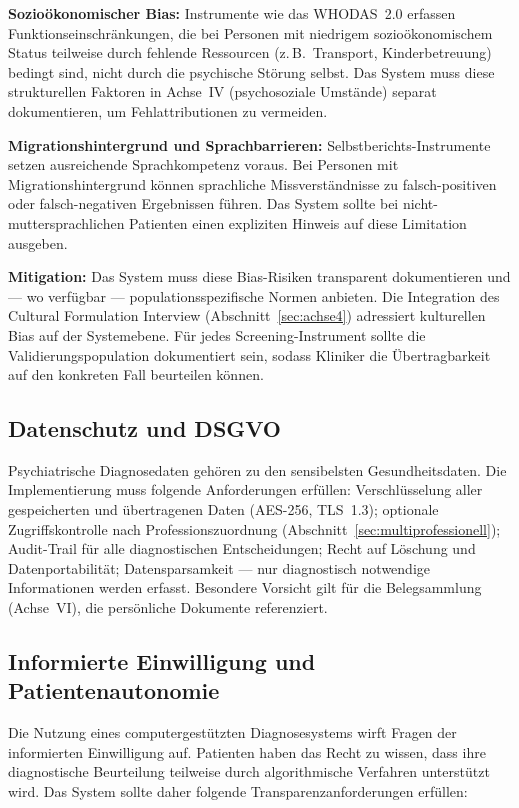 \documentclass[11pt,a4paper]{article}
\begin{document}
\textbf{Sozio\"okonomischer Bias:} Instrumente wie das WHODAS~2.0 erfassen Funktionseinschr\"ankungen, die bei Personen mit niedrigem sozio\"okonomischem Status teilweise durch fehlende Ressourcen (z.\,B.\ Transport, Kinderbetreuung) bedingt sind, nicht durch die psychische St\"orung selbst. Das System muss diese strukturellen Faktoren in Achse~IV (psychosoziale Umst\"ande) separat dokumentieren, um Fehlattributionen zu vermeiden.

\textbf{Migrationshintergrund und Sprachbarrieren:} Selbstberichts-Instrumente setzen ausreichende Sprachkompetenz voraus. Bei Personen mit Migrationshintergrund k\"onnen sprachliche Missverst\"andnisse zu falsch-positiven oder falsch-negativen Ergebnissen f\"uhren. Das System sollte bei nicht-muttersprachlichen Patienten einen expliziten Hinweis auf diese Limitation ausgeben.

\textbf{Mitigation:} Das System muss diese Bias-Risiken transparent dokumentieren und --- wo verf\"ugbar --- populationsspezifische Normen anbieten. Die Integration des Cultural Formulation Interview (Abschnitt~\ref{sec:achse4}) adressiert kulturellen Bias auf der Systemebene. F\"ur jedes Screening-Instrument sollte die Validierungspopulation dokumentiert sein, sodass Kliniker die \"Ubertragbarkeit auf den konkreten Fall beurteilen k\"onnen.

\subsection{Datenschutz und DSGVO}

Psychiatrische Diagnosedaten geh\"oren zu den sensibelsten Gesundheitsdaten. Die Implementierung muss folgende Anforderungen erf\"ullen: Verschl\"usselung aller gespeicherten und \"ubertragenen Daten (AES-256, TLS~1.3); optionale Zugriffskontrolle nach Professionszuordnung (Abschnitt~\ref{sec:multiprofessionell}); Audit-Trail f\"ur alle diagnostischen Entscheidungen; Recht auf L\"oschung und Datenportabilit\"at; Datensparsamkeit --- nur diagnostisch notwendige Informationen werden erfasst. Besondere Vorsicht gilt f\"ur die Belegsammlung (Achse~VI), die pers\"onliche Dokumente referenziert.

\subsection{Informierte Einwilligung und Patientenautonomie}

Die Nutzung eines computergest\"utzten Diagnosesystems wirft Fragen der informierten Einwilligung auf. Patienten haben das Recht zu wissen, dass ihre diagnostische Beurteilung teilweise durch algorithmische Verfahren unterst\"utzt wird. Das System sollte daher folgende Transparenzanforderungen erf\"ullen:
\end{document}
